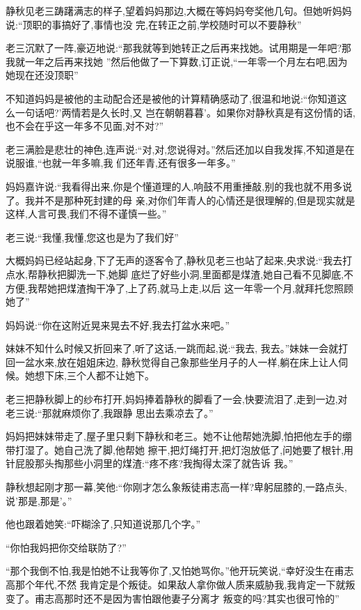 ﻿\documentclass[12pt]{article}
\begin{document}
静秋见老三踌躇满志的样子,望着妈妈那边,大概在等妈妈夸奖他几句。但她听妈妈说:``顶职的事搞好了,事情也没
完,在转正之前,学校随时可以不要静秋\myrule ''

老三沉默了一阵,豪迈地说:``那我就等到她转正之后再来找她。试用期是一年吧?那我就一年之后再来找她\myrule 
''然后他做了一下算数,订正说,``一年零一个月左右吧,因为她现在还没顶职\myrule ''

不知道妈妈是被他的主动配合还是被他的计算精确感动了,很温和地说:``你知道这么一句话吧?'两情若是久长时,又
岂在朝朝暮暮'。如果你对静秋真是有\myrule 这份情的话,也不会在乎这一年多不见面,对不对?''

老三满脸是悲壮的神色,连声说:``对,对,您说得对。''然后还加以自我发挥,不知道是在说服谁,``也就一年多嘛,我
们\myrule 还年青,还有很多\myrule 一年\myrule 多。''

妈妈嘉许说:``我看得出来,你是个懂道理的人,响鼓不用重捶敲,别的我也就不用多说了。我并不是那种死封建的母
亲,对你们年青人的心情还是很理解的,但是现实就是这样,人言可畏,我们不得不谨慎一些。''

老三说:``我懂,我懂,您这也是为了我们好\myrule ''

大概妈妈已经站起身,下了无声的逐客令了,静秋见老三也站了起来,央求说:``我去打点水,帮静秋把脚洗一下,她脚
底烂了好些小洞,里面都是煤渣,她自己看不见脚底,不方便,我帮她把煤渣掏干净了,上了药,就马上走\myrule ,以后
这一年零一个月,就\myrule 拜托您照顾她了\myrule ''

妈妈说:``你在这附近晃来晃去不好,我去打盆水来吧。''

妹妹不知什么时候又折回来了,听了这话,一跳而起,说:``我去, 我去。''妹妹一会就打回一盆水来,放在姐姐床边,
静秋觉得自己象那些坐月子的人一样,躺在床上让人伺候。她想下床,三个人都不让她下。

老三把静秋脚上的纱布打开,妈妈捧着静秋的脚看了一会,快要流泪了,走到一边,对老三说:``那就麻烦你了,我跟静
思出去乘凉去了。''

妈妈把妹妹带走了,屋子里只剩下静秋和老三。她不让他帮她洗脚,怕把他左手的绷带打湿了。她自己洗了脚,他帮她
擦干,把灯绳打开,把灯泡放低了,问她要了根针,用针屁股那头掏那些小洞里的煤渣:``疼不疼?我掏得太深了就告诉
我。''

静秋想起刚才那一幕,笑他:``你刚才怎么象叛徒甫志高一样?卑躬屈膝的,一路点头,说'那是,那是'。''

他也跟着她笑:``吓糊涂了,只知道说那几个字。''

``你怕我妈把你交给联防了?''

``那个我倒不怕,我是怕她不让我\myrule 等你了,又怕她骂你。''他开玩笑说,``幸好没生在甫志高那个年代,不然
我肯定是个叛徒。如果敌人拿你做人质来威胁我,我肯定一下就叛变了。甫志高那时还不是因为害怕跟他妻子分离才
叛变的吗?其实也很可怜的\myrule ''
\end{document}
